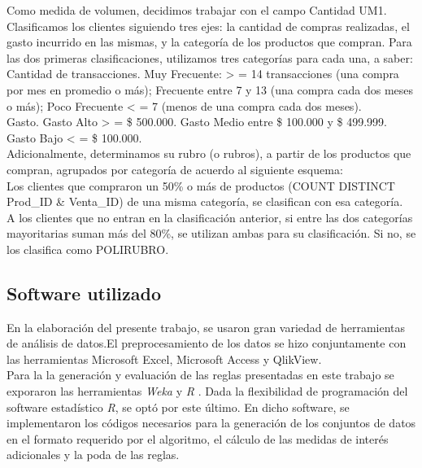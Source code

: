 \documentclass[]{article}
\begin{document}
Como medida de volumen, decidimos trabajar con el campo Cantidad UM1.\\

Clasificamos los clientes siguiendo tres ejes: la cantidad de compras realizadas, el gasto incurrido en las mismas, y la categoría de los productos que compran. Para las dos primeras clasificaciones, utilizamos tres categorías para cada una, a saber:\\

Cantidad de transacciones. Muy Frecuente: > = 14 transacciones (una compra por mes en promedio o más); Frecuente entre 7 y 13 (una compra cada dos meses o más); Poco Frecuente < = 7 (menos de una compra cada dos meses).\\

Gasto. Gasto Alto > = \$ 500.000. Gasto Medio entre \$ 100.000 y \$ 499.999. Gasto Bajo < = \$ 100.000.\\

Adicionalmente, determinamos su rubro (o rubros), a partir de los productos que compran, agrupados por categoría de acuerdo al siguiente esquema:\\

Los clientes que compraron un 50\% o más de productos (COUNT DISTINCT Prod\_ID \& Venta\_ID) de una misma categoría, se clasifican con esa categoría.\\

A los clientes que no entran en la clasificación anterior, si entre las dos categorías mayoritarias suman más del 80\%, se utilizan ambas para su clasificación. Si no, se los clasifica como POLIRUBRO.\\

\subsection{Software utilizado}
En la elaboración del presente trabajo, se usaron gran variedad de herramientas de análisis de datos.El preprocesamiento de los datos se hizo conjuntamente con las herramientas Microsoft Excel, Microsoft Access y QlikView. \\
Para la la generación y evaluación de las reglas presentadas en este trabajo se exporaron las herramientas \textit{Weka} \cite{Weka1} y \textit{R} \cite{RCran}. Dada la flexibilidad de programación del software estadístico \textit{R}, se optó por este último. En dicho software, se implementaron los códigos necesarios para la generación de los conjuntos de datos en el formato requerido por el algoritmo, el cálculo de las medidas de interés adicionales y la poda de las reglas.
\end{document}
